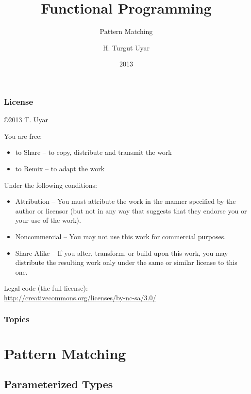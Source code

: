 \documentclass[dvipsnames]{beamer}
\title{Functional Programming}
\subtitle{Pattern Matching}
\author{H. Turgut Uyar}
\date{2013}
\theoremstyle{plain}
\begin{document}
\begin{frame}
  \titlepage
\end{frame}

\begin{frame}
  \frametitle{License}

  \hfill
  \copyright 2013 T. Uyar

  \vfill
  \begin{tiny}
    You are free:
    \begin{itemize}
      \item to Share -- to copy, distribute and transmit the work
      \item to Remix -- to adapt the work
    \end{itemize}

    Under the following conditions:
    \begin{itemize}
      \item Attribution -- You must attribute the work in the manner specified by
        the author or licensor (but not in any way that suggests that they
        endorse you or your use of the work).

      \item Noncommercial -- You may not use this work for commercial purposes.

      \item Share Alike -- If you alter, transform, or build upon this work, you
        may distribute the resulting work only under the same or similar license
        to this one.
    \end{itemize}
  \end{tiny}

  \vfill
  Legal code (the full license):\\
  \url{http://creativecommons.org/licenses/by-nc-sa/3.0/}
\end{frame}

\begin{frame}
  \frametitle{Topics}
  \tableofcontents
\end{frame}

\section{Pattern Matching}

\subsection{Parameterized Types}
\end{document}
